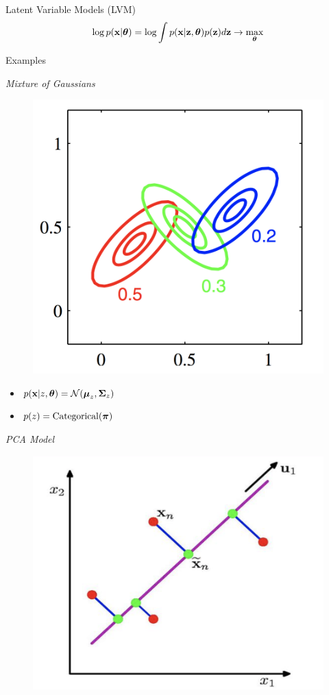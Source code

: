 \documentclass{beamer}
\begin{document}
\begin{frame}{Latent Variable Models (LVM)}
	\[
		\log p(\mathbf{x} | \boldsymbol{\theta}) = \log \int p(\mathbf{x} | \mathbf{z}, \boldsymbol{\theta}) p(\mathbf{z}) d\mathbf{z} \rightarrow \max_{\boldsymbol{\theta}}
	\]
    \eqpause
	\vspace{-0.6cm}
	\begin{block}{Examples}
		\begin{minipage}[t]{0.45\columnwidth}
			\textit{Mixture of Gaussians} \\
			\vspace{-0.5cm}
			\begin{figure}
				\centering
				\includegraphics[width=0.75\linewidth]{figs/mixture_of_gaussians}
			\end{figure}
			\vspace{-0.5cm}
			\begin{itemize}
				\item $p(\mathbf{x} | z, \boldsymbol{\theta}) = \mathcal{N}(\boldsymbol{\mu}_z, \boldsymbol{\Sigma}_z)$
				\item $p(z) = \mathrm{Categorical}(\boldsymbol{\pi})$
			\end{itemize}
		\end{minipage}%
        \eqpause
		\begin{minipage}[t]{0.53\columnwidth}
			\textit{PCA Model} \\
			\vspace{-0.5cm}
			\begin{figure}
				\centering
				\includegraphics[width=.7\linewidth]{figs/pca}

\end{figure}
\end{minipage}
\end{block}
\end{frame}
\end{document}
